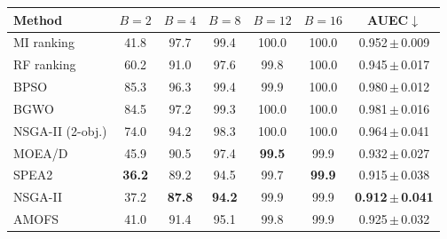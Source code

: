 \begin{tabular}{lcccccc}
\toprule
Method & $B=2$ & $B=4$ & $B=8$ & $B=12$ & $B=16$ & AUEC$\downarrow$ \\
\midrule
MI ranking & 41.8 & 97.7 & 99.4 & 100.0 & 100.0 & 0.952\,$\pm$\,0.009 \\
RF ranking & 60.2 & 91.0 & 97.6 & 99.8 & 100.0 & 0.945\,$\pm$\,0.017 \\
BPSO & 85.3 & 96.3 & 99.4 & 99.9 & 100.0 & 0.980\,$\pm$\,0.012 \\
BGWO & 84.5 & 97.2 & 99.3 & 100.0 & 100.0 & 0.981\,$\pm$\,0.016 \\
NSGA-II (2-obj.) & 74.0 & 94.2 & 98.3 & 100.0 & 100.0 & 0.964\,$\pm$\,0.041 \\
MOEA/D & 45.9 & 90.5 & 97.4 & \textbf{99.5} & 99.9 & 0.932\,$\pm$\,0.027 \\
SPEA2 & \textbf{36.2} & 89.2 & 94.5 & 99.7 & \textbf{99.9} & 0.915\,$\pm$\,0.038 \\
NSGA-II & 37.2 & \textbf{87.8} & \textbf{94.2} & 99.9 & 99.9 & \textbf{0.912\,$\pm$\,0.041} \\
AMOFS & 41.0 & 91.4 & 95.1 & 99.8 & 99.9 & 0.925\,$\pm$\,0.032 \\
\bottomrule
\end{tabular}
